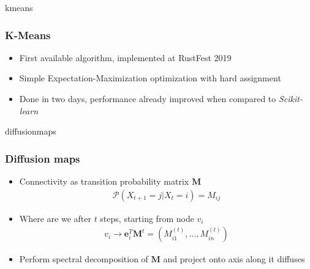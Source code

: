 \documentclass[xcolor=x11names,compress]{beamer}
\begin{document}
\begin{frame}{kmeans}
    \frametitle{K-Means}

    \begin{itemize}
        \item<1-> First available algorithm, implemented at RustFest 2019
        \item<2-> Simple Expectation-Maximization optimization with hard assignment
        \item<3-> Done in two days, performance already improved when compared to \textit{Scikit-learn}
            \vspace{1em} 
    \end{itemize}
\end{frame}

\begin{frame}{diffusionmaps}
    \frametitle{Diffusion maps}

    \begin{itemize}
        \item<1-> Connectivity as transition probability matrix $\mathbf{M}$
            \begin{align}
                \mathcal{P}(X_{t+1}=j|X_t=i) = M_{ij}
            \end{align}
        \item<2-> Where are we after $t$ steps, starting from node $v_i$
            \begin{align}
                v_i \to \mathbf{e}_i^T\mathbf{M}^t = (M_{i1}^{(t)},\dots,M_{in}^{(t)})
            \end{align}
        \item<3-> Perform spectral decomposition of $\mathbf{M}$ and project onto axis along it diffuses
    \end{itemize}
\end{frame}
\end{document}
